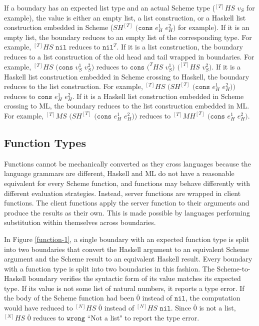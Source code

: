 If a boundary has an expected list type and an actual Scheme type ($^{[T]}HS$ $v_{S}$ for example), the value is either an empty list, a list construction, or a Haskell list construction embedded in Scheme ($SH^{[T]}$ $(\mathtt{cons}$ $e_{H}^{1}$ $e_{H}^{2})$ for example).  If it is an empty list, the boundary reduces to an empty list of the corresponding type.  For example, $^{[T]}HS$ $\mathtt{nil}$ reduces to $\mathtt{nil}^{T}$.  If it is a list construction, the boundary reduces to a list construction of the old head and tail wrapped in boundaries.  For example, $^{[T]}HS$ $(\mathtt{cons}$ $v_{S}^{1}$ $v_{S}^{2})$ reduces to $\mathtt{cons}$ $(^{T}HS$ $v_{S}^{1})$ $(^{[T]}HS$ $v_{S}^{2})$.  If it is a Haskell list construction embedded in Scheme crossing to Haskell, the boundary reduces to the list construction.  For example, $^{[T]}HS$ $(SH^{[T]}$ $(\mathtt{cons}$ $e_{H}^{1}$ $e_{H}^{2}))$ reduces to $\mathtt{cons}$ $e_{H}^{1}$ $e_{H}^{2}$.  If it is a Haskell list construction embedded in Scheme crossing to ML, the boundary reduces to the list construction embedded in ML.  For example, $^{[T]}MS$ $(SH^{[T]}$ $(\mathtt{cons}$ $e_{H}^{1}$ $e_{H}^{2}))$ reduces to $^{[T]}MH^{[T]}$ $(\mathtt{cons}$ $e_{H}^{1}$ $e_{H}^{2})$.

\subsection{Function Types}

Functions cannot be mechanically converted as they cross languages because the language grammars are different, Haskell and ML do not have a reasonable equivalent for every Scheme function, and functions may behave differently with different evaluation strategies.  Instead, server functions are wrapped in client functions.  The client functions apply the server function to their arguments and produce the results as their own.  This is made possible by languages performing substitution within themselves across boundaries.

In Figure \ref{function-1}, a single boundary with an expected function type is split into two boundaries that convert the Haskell argument to an equivalent Scheme argument and the Scheme result to an equivalent Haskell result.  Every boundary with a function type is split into two boundaries in this fashion.  The Scheme-to-Haskell boundary verifies the syntactic form of its value matches its expected type.  If its value is not some list of natural numbers, it reports a type error.  If the body of the Scheme function had been $\overline{0}$ instead of $\mathtt{nil}$, the computation would have reduced to $^{[N]}HS$ $\overline{0}$ instead of $^{[N]}HS$ $\mathtt{nil}$.  Since $\overline{0}$ is not a list, $^{[N]}HS$ $\overline{0}$ reduces to $\mathtt{wrong}$ ``Not a list" to report the type error.

